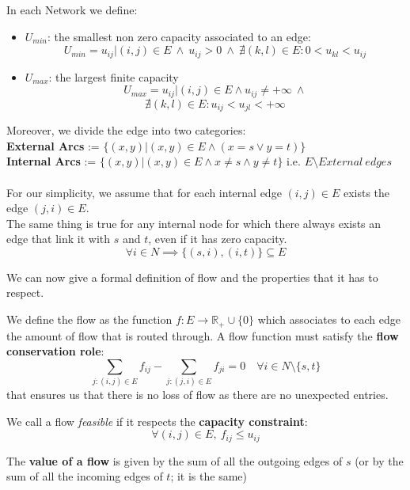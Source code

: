 \begin{definition}
    In each Network we define:
    \begin{itemize}
        \item $U_{min}$: the smallest non zero capacity associated to an edge:
        \[U_{min} = u_{ij} | (i,j) \in E\ \land\ u_{ij} > 0\ \land\ \nexists (k,l) \in E : 0<u_{kl}<u_{ij}\]
        \item $U_{max}$: the largest finite capacity
        \[U_{max} = u_{ij}| (i,j) \in E\land u_{ij} \not = + \infty\ \land \]
        \[\nexists (k,l) \in E : u_{ij}< u_{jl} < +\infty \]
    \end{itemize}
\end{definition}
Moreover, we divide the edge into two categories:\\
\textbf{External Arcs} := $\{(x,y) | (x,y)\in E \land (x = s \lor y = t)\}$\\
\textbf{Internal Arcs} := $\{(x,y) | (x,y)\in E \land x \not = s \land y \not = t\}$ i.e. $E \setminus External\ edges$\\
\\
For our simplicity, we assume that for each internal edge $(i,j)\in E$ exists the edge $(j,i) \in E$.\\ The same thing is true for any internal node for which there always exists an edge that link it with $s$ and $t$, even if it has zero capacity.
\[\forall i \in N \implies \{(s,i),(i,t)\} \subseteq E\]

We can now give a formal definition of flow and the properties that it has to respect.
\begin{definition}[Flow]
    We define the flow as the function $f: E \rightarrow\mathbb{R}_+ \cup \{0\}$ which associates to each edge the amount of flow that is routed through.
    A flow function must satisfy the \textbf{flow conservation role}:
    \[\sum_{j:(i,j) \in E} f_{ij} - \sum_{j:(j,i) \in E}f_{ji} = 0 \quad \forall i \in N\setminus\{s,t\}\]
    that ensures us that there is no loss of flow as there are no unexpected entries.
\end{definition}

We call a flow \textit{feasible} if it respects the \textbf{capacity constraint}: \[\forall (i,j) \in E,\ f_{ij} \le u_{ij}\]

\begin{definition}

The \textbf{value of a flow} is given by the sum of all the outgoing edges of $s$ (or by the sum of all the incoming edges of $t$; it is the same)   
\end{definition}

